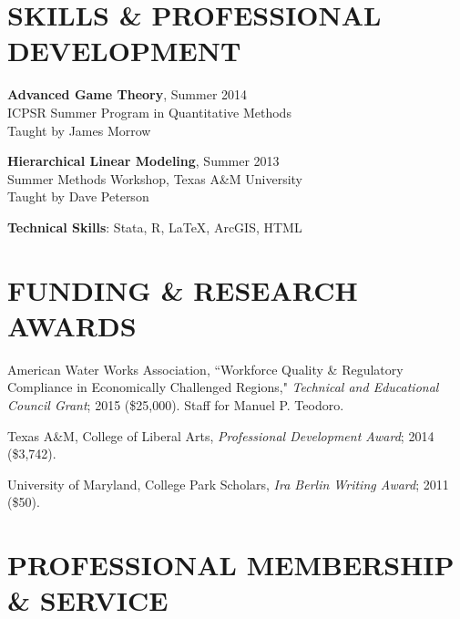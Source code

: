 \documentclass[margin]{res} %
\begin{document}
\begin{resume}
\section{SKILLS \& PROFESSIONAL DEVELOPMENT}

 \begin{hangparas}{.25in}{1} \textbf{Advanced Game Theory}, Summer 2014 \\
 ICPSR Summer Program in Quantitative Methods \\
Taught by James Morrow

\textbf{Hierarchical Linear Modeling}, Summer 2013 \\
 Summer Methods Workshop, Texas A\&M University \\
 Taught by Dave Peterson

\textbf{Technical Skills}: Stata, R, \LaTeX, ArcGIS, HTML	 \end{hangparas}	





\section{FUNDING \& RESEARCH AWARDS}

 \begin{hangparas}{.25in}{1} American Water Works Association, ``Workforce Quality \& Regulatory Compliance in Economically Challenged Regions," \textit{Technical and Educational Council Grant}; 2015 (\$25,000). Staff for Manuel P. Teodoro.

Texas A\&M, College of Liberal Arts, \textit{Professional Development Award}; 2014 (\$3,742).

University of Maryland, College Park Scholars, \textit{Ira Berlin Writing Award}; 2011 (\$50). \end{hangparas}



\section{PROFESSIONAL MEMBERSHIP \& SERVICE}


\end{resume}
\end{document}

